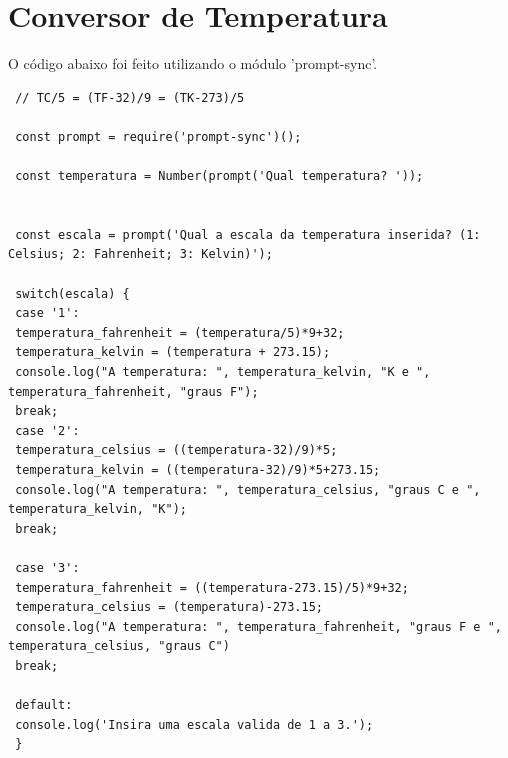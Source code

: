  \section{Conversor de Temperatura}
 O código abaixo foi feito utilizando o módulo 'prompt-sync'.
 \begin{lstlisting}
 // TC/5 = (TF-32)/9 = (TK-273)/5
 
 const prompt = require('prompt-sync')();
 
 const temperatura = Number(prompt('Qual temperatura? '));
 
 
 const escala = prompt('Qual a escala da temperatura inserida? (1: Celsius; 2: Fahrenheit; 3: Kelvin)');
 
 switch(escala) {
 case '1':
 temperatura_fahrenheit = (temperatura/5)*9+32;
 temperatura_kelvin = (temperatura + 273.15);
 console.log("A temperatura: ", temperatura_kelvin, "K e ", temperatura_fahrenheit, "graus F");
 break;
 case '2':
 temperatura_celsius = ((temperatura-32)/9)*5;
 temperatura_kelvin = ((temperatura-32)/9)*5+273.15;
 console.log("A temperatura: ", temperatura_celsius, "graus C e ", temperatura_kelvin, "K");
 break;
 
 case '3':
 temperatura_fahrenheit = ((temperatura-273.15)/5)*9+32;
 temperatura_celsius = (temperatura)-273.15;
 console.log("A temperatura: ", temperatura_fahrenheit, "graus F e ", temperatura_celsius, "graus C")
 break;
 
 default:
 console.log('Insira uma escala valida de 1 a 3.');
 }
 \end{lstlisting}
 
